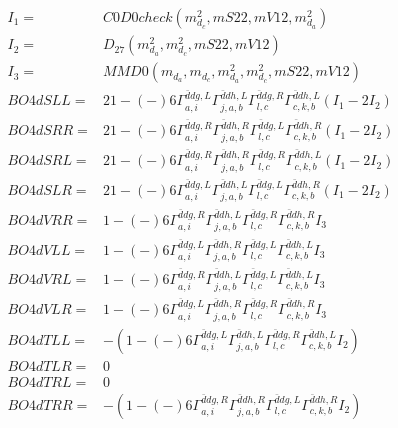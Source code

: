 \documentclass[A4,landscape]{article}
\begin{document}
\begin{align} 
I_1 = & C0D0check(m^2_{d_{{c}}}, mS22, mV12, m^2_{d_{{a}}}) \\ 
I_2 = & D_{27}(m^2_{d_{{a}}}, m^2_{d_{{c}}}, mS22, mV12) \\ 
I_3 = & MMD0(m_{d_{{a}}}, m_{d_{{c}}}, m^2_{d_{{a}}}, m^2_{d_{{c}}}, mS22, mV12) \\ 
  BO4dSLL= & 2   1
-(-)
  6 \Gamma^{\bar{d}d g ,L}_{a, i} \Gamma^{\bar{d}d h ,L}_{j, a, b} \Gamma^{\bar{d}d g ,R}_{l, c} \Gamma^{\bar{d}d h ,L}_{c, k, b} (I_1 - 2 I_2) \\ 
  BO4dSRR= & 2   1
-(-)
  6 \Gamma^{\bar{d}d g ,R}_{a, i} \Gamma^{\bar{d}d h ,R}_{j, a, b} \Gamma^{\bar{d}d g ,L}_{l, c} \Gamma^{\bar{d}d h ,R}_{c, k, b} (I_1 - 2 I_2) \\ 
  BO4dSRL= & 2   1
-(-)
  6 \Gamma^{\bar{d}d g ,R}_{a, i} \Gamma^{\bar{d}d h ,R}_{j, a, b} \Gamma^{\bar{d}d g ,R}_{l, c} \Gamma^{\bar{d}d h ,L}_{c, k, b} (I_1 - 2 I_2) \\ 
  BO4dSLR= & 2   1
-(-)
  6 \Gamma^{\bar{d}d g ,L}_{a, i} \Gamma^{\bar{d}d h ,L}_{j, a, b} \Gamma^{\bar{d}d g ,L}_{l, c} \Gamma^{\bar{d}d h ,R}_{c, k, b} (I_1 - 2 I_2) \\ 
  BO4dVRR= &   1
-(-)
  6 \Gamma^{\bar{d}d g ,R}_{a, i} \Gamma^{\bar{d}d h ,L}_{j, a, b} \Gamma^{\bar{d}d g ,R}_{l, c} \Gamma^{\bar{d}d h ,R}_{c, k, b} I_3 \\ 
  BO4dVLL= &   1
-(-)
  6 \Gamma^{\bar{d}d g ,L}_{a, i} \Gamma^{\bar{d}d h ,R}_{j, a, b} \Gamma^{\bar{d}d g ,L}_{l, c} \Gamma^{\bar{d}d h ,L}_{c, k, b} I_3 \\ 
  BO4dVRL= &   1
-(-)
  6 \Gamma^{\bar{d}d g ,R}_{a, i} \Gamma^{\bar{d}d h ,L}_{j, a, b} \Gamma^{\bar{d}d g ,L}_{l, c} \Gamma^{\bar{d}d h ,L}_{c, k, b} I_3 \\ 
  BO4dVLR= &   1
-(-)
  6 \Gamma^{\bar{d}d g ,L}_{a, i} \Gamma^{\bar{d}d h ,R}_{j, a, b} \Gamma^{\bar{d}d g ,R}_{l, c} \Gamma^{\bar{d}d h ,R}_{c, k, b} I_3 \\ 
  BO4dTLL= & -(  1
-(-)
  6 \Gamma^{\bar{d}d g ,L}_{a, i} \Gamma^{\bar{d}d h ,L}_{j, a, b} \Gamma^{\bar{d}d g ,R}_{l, c} \Gamma^{\bar{d}d h ,L}_{c, k, b} I_2) \\ 
  BO4dTLR= & 0 \\ 
  BO4dTRL= & 0 \\ 
  BO4dTRR= & -(  1
-(-)
  6 \Gamma^{\bar{d}d g ,R}_{a, i} \Gamma^{\bar{d}d h ,R}_{j, a, b} \Gamma^{\bar{d}d g ,L}_{l, c} \Gamma^{\bar{d}d h ,R}_{c, k, b} I_2) \\ 
\end{align} 
\end{document}
